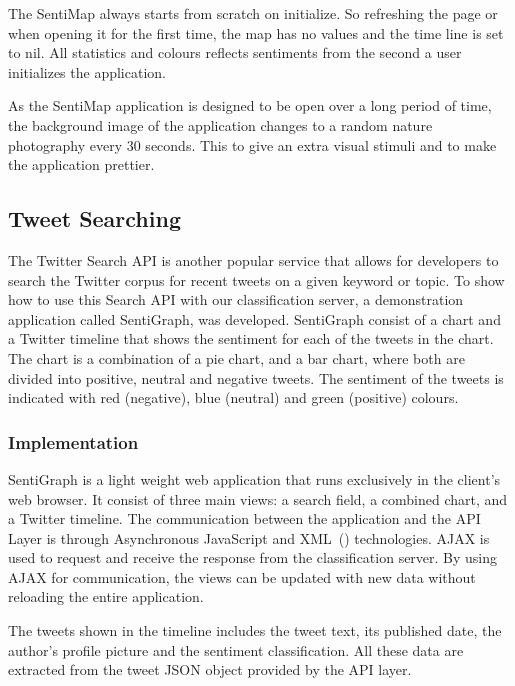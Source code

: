 The SentiMap always starts from scratch on initialize. So refreshing the page or when opening it for the first time, the map has no values and the time line is set to nil. All statistics and colours reflects sentiments from the second a user initializes the application.

As the SentiMap application is designed to be open over a long period of time, the background image of the application changes to a random nature photography every 30 seconds. This to give an extra visual stimuli and to make the application prettier.



\subsection{Tweet Searching}

The Twitter Search API is another popular service that allows for developers to search the Twitter corpus for recent tweets on a given keyword or topic. To show how to use this Search API with our classification server, a demonstration application called SentiGraph, was developed. SentiGraph consist of a chart and a Twitter timeline that shows the sentiment for each of the tweets in the chart. The chart is a combination of a pie chart, and a bar chart, where both are divided into positive, neutral and negative tweets. The sentiment of the tweets is indicated with red (negative), blue (neutral) and green (positive) colours.

\subsubsection{Implementation}

SentiGraph is a light weight web application that runs exclusively in the client's web browser. It consist of three main views: a search field, a combined chart, and a Twitter timeline. The communication between the application and the API Layer is through Asynchronous JavaScript and XML~() technologies. AJAX is used to request and receive the response from the classification server. By using AJAX for communication, the views can be updated with new data without reloading the entire application.

The tweets shown in the timeline includes the tweet text, its published date, the author's profile picture and the sentiment classification. All these data are extracted from the tweet JSON object provided by the API layer.

